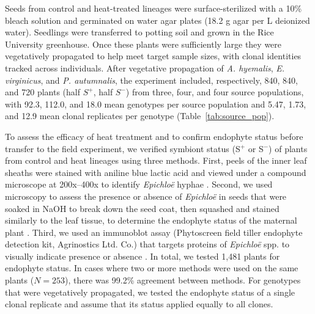 \documentclass[12pt]{article}\usepackage[]{graphicx}\usepackage[dvipsnames]{xcolor}
\begin{document}
Seeds from control and heat-treated lineages were surface-sterilized with a 10\% bleach solution and germinated on water agar plates (18.2 g agar per L deionized water).
Seedlings were transferred to potting soil and grown in the Rice University greenhouse. 
Once these plants were sufficiently large they were vegetatively propagated to help meet target sample sizes, with clonal identities tracked across individuals. 
After vegetative propagation of \textit{A. hyemalis}, \textit{E. virginicus}, and \textit{P. autumnalis}, the experiment included, respectively, 840, 840, and 720 plants (half $S^+$, half $S^-$) from three, four, and four source populations, with 92.3, 112.0, and 18.0 mean genotypes per source population and 5.47, 1.73, and 12.9 mean clonal replicates per genotype (Table~\ref{tab:source_pop}). 

To assess the efficacy of heat treatment and to confirm endophyte status before transfer to the field experiment, we verified symbiont status (S$^+$ or S$^-$) of plants from control and heat lineages using three methods. 
First, peels of the inner leaf sheaths were stained with aniline blue lactic acid and viewed under a compound microscope at 200x–400x to identify \emph{Epichloë} hyphae \citep{jackson1988rapid}. 
Second, we used microscopy to assess the presence or absence of \emph{Epichloë} in seeds that were soaked in NaOH to break down the seed coat, then squashed and stained similarly to the leaf tissue, to determine the endophyte status of the maternal plant \citep{fowler2025increasing}. 
Third, we used an immunoblot assay (Phytoscreen field tiller endophyte detection kit, Agrinostics Ltd. Co.) that targets proteins of \emph{Epichloë} spp. to visually indicate presence or absence \citep{koh2006rapid}. 
In total, we tested 1,481 plants for endophyte status. 
In cases where two or more methods were used on the same plants ($N=253$), there was 99.2\% agreement between methods.
For genotypes that were vegetatively propagated, we tested the endophyte status of a single clonal replicate and assume that its status applied equally to all clones. 
\end{document}
